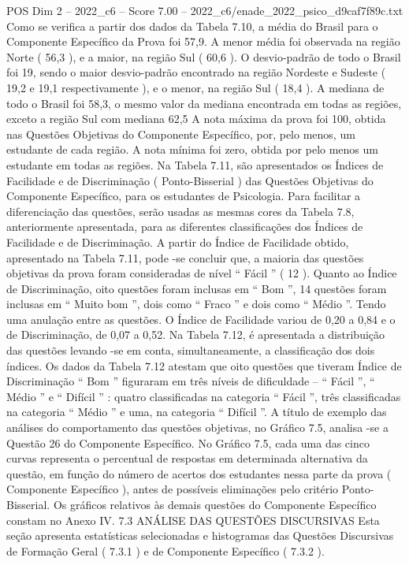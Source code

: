 \begin{textsample}{POS Dim 2 – 2022\_c6 – Score 7.00 – 2022\_c6/enade\_2022\_psico\_d9caf7f89c.txt}
Como se verifica a partir dos dados da Tabela 7.10, a média do Brasil para o Componente Específico da Prova foi 57,9.
A menor média foi observada na região Norte ( 56,3 ), e a maior, na região Sul ( 60,6 ).
O desvio-padrão de todo o Brasil foi 19, sendo o maior desvio-padrão encontrado na região Nordeste e Sudeste ( 19,2 e 19,1 respectivamente ), e o menor, na região Sul ( 18,4 ).
A mediana de todo o Brasil foi 58,3, o mesmo valor da mediana encontrada em todas as regiões, exceto a região Sul com mediana 62,5 A nota máxima da prova foi 100, obtida nas Questões Objetivas do Componente Específico, por, pelo menos, um estudante de cada região.
A nota mínima foi zero, obtida por pelo menos um estudante em todas as regiões.
Na Tabela 7.11, são apresentados os Índices de Facilidade e de Discriminação ( Ponto-Bisserial ) das Questões Objetivas do Componente Específico, para os estudantes de Psicologia.
Para facilitar a diferenciação das questões, serão usadas as mesmas cores da Tabela 7.8, anteriormente apresentada, para as diferentes classificações dos Índices de Facilidade e de Discriminação.
A partir do Índice de Facilidade obtido, apresentado na Tabela 7.11, pode -se concluir que, a maioria das questões objetivas da prova foram consideradas de nível “ Fácil ” ( 12 ).
Quanto ao Índice de Discriminação, oito questões foram inclusas em “ Bom ”, 14 questões foram inclusas em “ Muito bom ”, dois como “ Fraco ” e dois como “ Médio ”.
Tendo uma anulação entre as questões.
O Índice de Facilidade variou de 0,20 a 0,84 e o de Discriminação, de 0,07 a 0,52.
Na Tabela 7.12, é apresentada a distribuição das questões levando -se em conta, simultaneamente, a classificação dos dois índices.
Os dados da Tabela 7.12 atestam que oito questões que tiveram Índice de Discriminação “ Bom ” figuraram em três níveis de dificuldade – “ Fácil ”, “ Médio ” e “ Difícil ” : quatro classificadas na categoria “ Fácil ”, três classificadas na categoria “ Médio ” e uma, na categoria “ Difícil ”.
A título de exemplo das análises do comportamento das questões objetivas, no Gráfico 7.5, analisa -se a Questão 26 do Componente Específico.
No Gráfico 7.5, cada uma das cinco curvas representa o percentual de respostas em determinada alternativa da questão, em função do número de acertos dos estudantes nessa parte da prova ( Componente Específico ), antes de possíveis eliminações pelo critério Ponto-Bisserial.
Os gráficos relativos às demais questões do Componente Específico constam no Anexo IV. 7.3 ANÁLISE DAS QUESTÕES DISCURSIVAS Esta seção apresenta estatísticas selecionadas e histogramas das Questões Discursivas de Formação Geral ( 7.3.1 ) e de Componente Específico ( 7.3.2 ).

\end{textsample}

